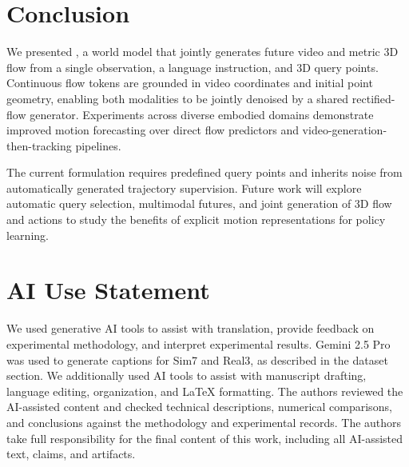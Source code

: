 \section{Conclusion}
\label{sec:conclusion}

We presented \method{}, a world model that jointly generates
future video and metric 3D flow from a single observation,
a language instruction, and 3D query points.
Continuous flow tokens are grounded in video coordinates
and initial point geometry, enabling both modalities to be
jointly denoised by a shared rectified-flow generator.
Experiments across diverse embodied domains demonstrate
improved motion forecasting over direct flow predictors
and video-generation-then-tracking pipelines.

The current formulation requires predefined query points
and inherits noise from automatically generated trajectory
supervision.
Future work will explore automatic query selection,
multimodal futures, and joint generation of 3D flow and
actions to study the benefits of explicit motion
representations for policy learning.

\section*{AI Use Statement}
We used generative AI tools to assist with translation,
provide feedback on experimental methodology, and
interpret experimental results.
Gemini 2.5 Pro was used to generate captions for
Sim7 and Real3, as described in the dataset section.
We additionally used AI tools to assist with manuscript
drafting, language editing, organization, and LaTeX
formatting.
The authors reviewed the AI-assisted content and checked
technical descriptions, numerical comparisons, and
conclusions against the methodology and experimental
records.
The authors take full responsibility for the final
content of this work, including all AI-assisted text,
claims, and artifacts.